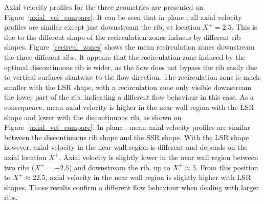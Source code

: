 Axial velocity profiles for the three geometries are presented on Figure~\ref{axial_vel_compare}. It can be seen that in plane , all axial velocity profiles are similar except just downstream the rib, at location $X^+=2.5$. This is due to the different shape of the recirculation zones induces by different rib shapes. Figure~\ref{recircul_zones} shows the mean recirculation zones downstream the three different ribs. It appears that the recirculation zone induced by the optimal discontinuous rib is wider, as the flow does not bypass the rib easily due to vertical surfaces slantwise to the flow direction. The recirculation zone is much smaller with the LSR shape, with a recirculation zone only visible downstream the lower part of the rib, indicating a different flow behaviour in this case. As a consequence, mean axial velocity is higher in the near wall region with the LSR shape and lower with the discontinuous rib, as shown on Figure~\ref{axial_vel_compare}. In plane , mean axial velocity profiles are similar between the discontinuous rib shape and the SSR shape. With the LSR shape however, axial velocity in the near wall region is different and depends on the axial location $X^+$. Axial velocity is slightly lower in the near wall region between two ribs ($X^+=-2.5$) and downstream the rib, up to $X^+ \approx 5$. From this position to $X^+ \approx 22.5$, axial velocity in the near wall region is slightly higher with LSR shapes. Those results confirm a different flow behaviour when dealing with larger ribs.\\

